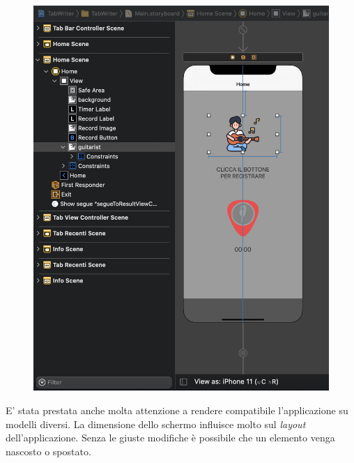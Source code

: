 \begin{figure}[H]
	\centering
	\includegraphics[scale=0.20]{./images/img2.png}
\end{figure}
E' stata prestata anche molta attenzione a rendere compatibile l'applicazione su modelli diversi. La dimensione dello schermo influisce molto sul \textit{layout} dell'applicazione. Senza le giuste modifiche è possibile che un elemento venga nascosto o spostato.
